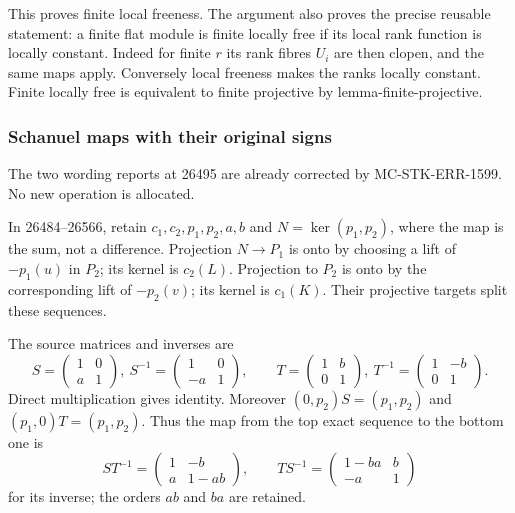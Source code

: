 This proves finite local freeness. The argument also proves the precise reusable statement: a finite flat module is finite locally free if its local rank function is locally constant. Indeed for finite \(r\) its rank fibres \(U_i\) are then clopen, and the same maps apply. Conversely local freeness makes the ranks locally constant. Finite locally free is equivalent to finite projective by lemma-finite-projective.

\subsubsection{Schanuel maps with their original signs}\label{schanuel-maps-with-their-original-signs}

The two wording reports at 26495 are already corrected by MC-STK-ERR-1599. No new operation is allocated.

In 26484--26566, retain \(c_1,c_2,p_1,p_2,a,b\) and \(N=\ker(p_1,p_2)\), where the map is the sum, not a difference. Projection \(N\to P_1\) is onto by choosing a lift of \(-p_1(u)\) in \(P_2\); its kernel is \(c_2(L)\). Projection to \(P_2\) is onto by the corresponding lift of \(-p_2(v)\); its kernel is \(c_1(K)\). Their projective targets split these sequences.

The source matrices and inverses are \[
S=\begin{pmatrix}1&0\\a&1\end{pmatrix},\
S^{-1}=\begin{pmatrix}1&0\\-a&1\end{pmatrix},\qquad
T=\begin{pmatrix}1&b\\0&1\end{pmatrix},\
T^{-1}=\begin{pmatrix}1&-b\\0&1\end{pmatrix}.
\] Direct multiplication gives identity. Moreover \((0,p_2)S=(p_1,p_2)\) and \((p_1,0)T=(p_1,p_2)\). Thus the map from the top exact sequence to the bottom one is \[
ST^{-1}=\begin{pmatrix}1&-b\\a&1-ab\end{pmatrix},
\qquad
TS^{-1}=\begin{pmatrix}1-ba&b\\-a&1\end{pmatrix}
\] for its inverse; the orders \(ab\) and \(ba\) are retained.

